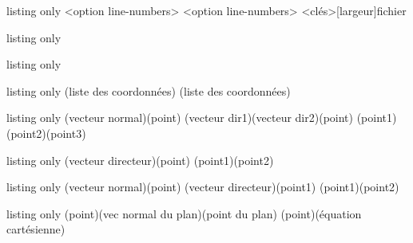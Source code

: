 \begin{PresCodeTexPL}{listing only}
<option line-numbers>
<option line-numbers>
\PitonThonnyEditorFichier<clés>[largeur]{fichier}
\end{PresCodeTexPL}

\begin{PresCodeTexPL}{listing only}
\PaveTikz[options]
\TetraedreTikz[options]
\end{PresCodeTexPL}

\begin{PresCodeTexPL}{listing only}
\CercleTrigo[clés]
\pflcercletrigo
\end{PresCodeTexPL}

\begin{PresCodeTexPL}{listing only}
(liste des coordonnées)
(liste des coordonnées)
\end{PresCodeTexPL}

\begin{PresCodeTexPL}{listing only}
\TrouveEqCartPlan[clés](vecteur normal)(point)
\TrouveEqCartPlan[clés](vecteur dir1)(vecteur dir2)(point)
\TrouveEqCartPlan[clés](point1)(point2)(point3)
\end{PresCodeTexPL}

\begin{PresCodeTexPL}{listing only}
\TrouveEqParamDroite[clés](vecteur directeur)(point)
\TrouveEqParamDroite[clés](point1)(point2)
\end{PresCodeTexPL}

\begin{PresCodeTexPL}{listing only}
\TrouveEqCartDroite[clés](vecteur normal)(point)
(vecteur directeur)(point1)
\TrouveEqCartDroite[clés](point1)(point2)
\end{PresCodeTexPL}

\begin{PresCodeTexPL}{listing only}
\TrouveDistancePtPlan(point)(vec normal du plan)(point du plan)
\TrouveDistancePtPlan(point)(équation cartésienne)
\end{PresCodeTexPL}

